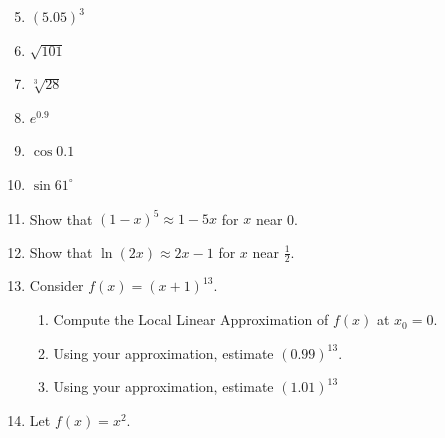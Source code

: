 \documentclass[12pt]{article}
\newif\ifans
\begin{document}
\begin{enumerate}
\setcounter{enumi}{4}

\item $(5.05)^3$ 

\ifans{\fbox{128.75}} \fi

\item $\sqrt{101}$ 

\ifans{\fbox{$10.05$}} \fi

\item $\sqrt[3]{28}$ 

\ifans{\fbox{$\frac{82}{27}$}} \fi

\item $e^{0.9}$ 

\ifans{\fbox{$\frac{9}{10}e$}} \fi

\item $\cos{0.1}$

\ifans{\fbox{1}} \fi

\item $\sin{61^{\circ}}$ 

\ifans{\fbox{$\frac{\sqrt{3}}{2}+\frac{\pi}{360} $}} \fi

\item Show that $(1-x)^5 \approx 1-5x$ for $x$ near 0.

\item Show that $\ln{(2x)} \approx 2x-1$ for $x$ near $\frac{1}{2}$.

\item Consider $f(x)=(x+1)^{13}$.

\begin{enumerate}

\item Compute the Local Linear Approximation of $f(x)$ at $x_0=0$.

\ifans{\fbox{$(x+1)^{13} \approx 1+13x$ for $x$ near 0}} \fi

\item Using your approximation, estimate $(0.99)^{13}$.

 \ifans{\fbox{$0.87$}} \fi

\item Using your approximation, estimate $(1.01)^{13}$

 \ifans{\fbox{$1.13$}} \fi

\end{enumerate}

\item Let $f(x)=x^2$.

\begin{enumerate}


\end{enumerate}
\end{enumerate}
\end{document}

